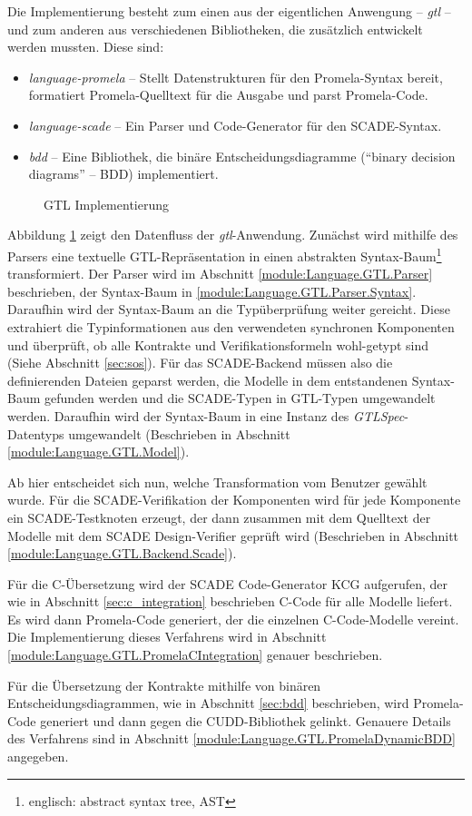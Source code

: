 

Die Implementierung besteht zum einen aus der eigentlichen Anwengung -- \emph{gtl} -- und zum anderen aus verschiedenen Bibliotheken, die zusätzlich entwickelt werden mussten.
Diese sind:
\begin{itemize}
\item \emph{language-promela} -- Stellt Datenstrukturen für den Promela-Syntax bereit, formatiert Promela-Quelltext für die Ausgabe und parst Promela-Code.
\item \emph{language-scade} -- Ein Parser und Code-Generator für den SCADE-Syntax.
\item \emph{bdd} -- Eine Bibliothek, die binäre Entscheidungsdiagramme ("`binary decision diagrams"' -- BDD) implementiert.
\end{itemize}

\begin{figure}[h]
  \centering
  
  \caption{GTL Implementierung}
  \label{fig:gtl_implementation}
\end{figure}

Abbildung \ref{fig:gtl_implementation} zeigt den Datenfluss der \emph{gtl}-Anwendung.
Zunächst wird mithilfe des Parsers eine textuelle GTL-Repräsentation in einen abstrakten Syntax-Baum\footnote{englisch: abstract syntax tree, AST} transformiert.
Der Parser wird im Abschnitt \ref{module:Language.GTL.Parser} beschrieben, der Syntax-Baum in \ref{module:Language.GTL.Parser.Syntax}.
Daraufhin wird der Syntax-Baum an die Typüberprüfung weiter gereicht.
Diese extrahiert die Typinformationen aus den verwendeten synchronen Komponenten und überprüft, ob alle Kontrakte und Verifikationsformeln wohl-getypt sind (Siehe Abschnitt \ref{sec:sos}).
Für das SCADE-Backend müssen also die definierenden Dateien geparst werden, die Modelle in dem entstandenen Syntax-Baum gefunden werden und die SCADE-Typen in GTL-Typen umgewandelt werden.
Daraufhin wird der Syntax-Baum in eine Instanz des \emph{GTLSpec}-Datentyps umgewandelt (Beschrieben in Abschnitt \ref{module:Language.GTL.Model}).

Ab hier entscheidet sich nun, welche Transformation vom Benutzer gewählt wurde.
Für die SCADE-Verifikation der Komponenten wird für jede Komponente ein SCADE-Testknoten erzeugt, der dann zusammen mit dem Quelltext der Modelle mit dem SCADE Design-Verifier geprüft wird (Beschrieben in Abschnitt \ref{module:Language.GTL.Backend.Scade}).

Für die C-Übersetzung wird der SCADE Code-Generator KCG aufgerufen, der wie in Abschnitt \ref{sec:c_integration} beschrieben C-Code für alle Modelle liefert.
Es wird dann Promela-Code generiert, der die einzelnen C-Code-Modelle vereint.
Die Implementierung dieses Verfahrens wird in Abschnitt \ref{module:Language.GTL.PromelaCIntegration} genauer beschrieben.

Für die Übersetzung der Kontrakte mithilfe von binären Entscheidungsdiagrammen, wie in Abschnitt \ref{sec:bdd} beschrieben, wird Promela-Code generiert und dann gegen die CUDD-Bibliothek gelinkt.
Genauere Details des Verfahrens sind in Abschnitt \ref{module:Language.GTL.PromelaDynamicBDD} angegeben.